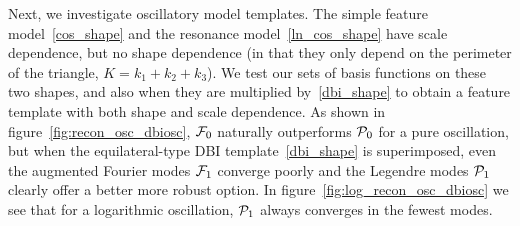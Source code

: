 Next, we investigate oscillatory model templates.
The simple feature model~\eqref{cos_shape} and the resonance model~\eqref{ln_cos_shape}
have scale dependence, but no shape dependence (in that they only depend on the perimeter
of the triangle, $K=k_1+k_2+k_3$).
We test our sets of basis functions on these two shapes,
and also when they are multiplied by~\eqref{dbi_shape} to obtain a feature
template with both shape and scale dependence.
As shown in figure~\ref{fig:recon_osc_dbiosc},
$\mathcal{F}_0$ naturally outperforms $\mathcal{P}_0$ for a pure oscillation,
but when the equilateral-type DBI template~\eqref{dbi_shape} is superimposed, even the augmented Fourier modes
$\mathcal{F}_1$ converge poorly and the Legendre modes $\mathcal{P}_1$ clearly offer a better more robust option.
In figure~\ref{fig:log_recon_osc_dbiosc} we see that for a logarithmic
oscillation, $\mathcal{P}_1$ always converges in the fewest modes.


